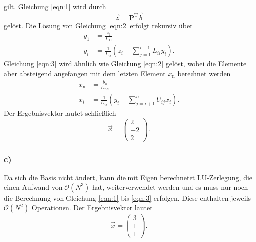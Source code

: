 \documentclass{scrartcl}
\begin{document}
            gilt. Gleichung \eqref{eqn:1} wird durch
            \[ 
                \vec{z} = \mathbf{P}^{\text{T}} \vec{b}
            \]
            gelöst. Die Lösung von Gleichung \eqref{eqn:2} erfolgt rekursiv über
            \begin{align*}
                y_1 &= \frac{z_1}{L_{11}} \\
                y_i &= \frac{1}{L_{ii}} \left(z_i - \sum_{j=1}^{i-1} L_{ii} y_i \right).
            \end{align*}
            Gleichung \eqref{eqn:3} wird ähnlich wie Gleichung \eqref{eqn:2} gelöst, wobei die Elemente aber absteigend angefangen
            mit dem letzten Element $x_\text{n}$ berechnet werden
            \begin{align*}
                x_{\text{n}} &= \frac{y_{n}}{U_{nn}} \\
                x_i &= \frac{1}{U_{ii}} \left(y_i - \sum_{j=i+1}^{n} U_{ij} x_i \right).
            \end{align*}
            Der Ergebnisvektor lautet schließlich
            \begin{equation*}
                \vec{x} = 
                \begin{pmatrix}
                    2 \\
                    -2 \\
                    2   
                \end{pmatrix}.
            \end{equation*}

        \subsubsection*{c)}

            Da sich die Basis nicht ändert, kann die mit Eigen berechnetet LU-Zerlegung, die einen Aufwand von $\mathcal{O} (N^3)$ hat, 
            weiterverwendet werden und es muss nur noch
            die Berechnung von Gleichung \eqref{eqn:1} bis \eqref{eqn:3} erfolgen. Diese enthalten jeweils $\mathcal{O}(N^2)$ Operationen.
            Der Ergebnisvektor lautet
            \begin{equation*}
                \vec{x} = 
                \begin{pmatrix}
                    3 \\
                    1 \\
                    1   
                \end{pmatrix}.
            \end{equation*}
\end{document}
